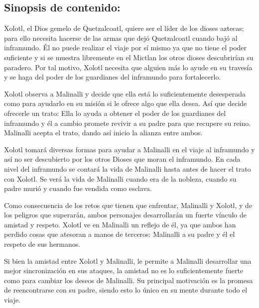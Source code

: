 \documentclass[11pt,letterpaper]{article}
\begin{document}
    	\subsection{Sinopsis de contenido:} 
Xolotl, el Dios gemelo de Quetzalcoatl, quiere ser el líder de los dioses aztecas; para ello necesita hacerse de las armas que dejó Quetzalcoatl cuando bajó al inframundo. Él no puede realizar el viaje por sí mismo ya que no tiene el poder suficiente y si se muestra libremente en el Mictlan los otros dioses descubrirían su paradero. Por tal motivo, Xolotl necesita que alguien más lo ayude en su travesía y se haga del poder de los guardianes del inframundo para fortalecerlo.
\\
\par
Xolotl observa a Malinalli y decide que ella está lo suficientemente desesperada como para ayudarlo en su misión si le ofrece algo que ella desea. Así que decide ofrecerle un trato: Ella lo ayuda a obtener el poder de los guardianes del inframundo y él a cambio promete revivir a su padre para que recupere su reino. Malinalli acepta el trato, dando así inicio la alianza entre ambos.
\\
\par   	
 Xolotl tomará diversas formas para ayudar a Malinalli en el viaje al inframundo y así no ser descubierto por los otros Dioses que moran el inframundo. En cada nivel del inframundo se contará la vida de Malinalli hasta antes de hacer el trato con Xolotl. Se verá la vida de Malinalli cuando era de la nobleza, cuando su padre murió y cuando fue vendida como esclava.
\\
\par
Como consecuencia de los retos que tienen que enfrentar, Malinalli y Xolotl, y de los peligros que superarán, ambos personajes desarrollarán un fuerte vínculo de amistad y respeto. Xolotl ve en Malinalli un reflejo de él, ya que ambos han perdido cosas que atesoran a manos de terceros: Malinalli a su padre y él el respeto de sus hermanos.
\\
\par
Si bien la amistad entre Xolotl y Malinalli, le permite a Malinalli desarrollar una mejor sincronización en sus ataques, la amistad no es lo suficientemente fuerte como para cambiar los deseos de Malinalli. Su principal motivación es la promesa de reencontrarse con su padre, siendo esto lo único en su mente durante todo el viaje.
\\
\par
\end{document}
